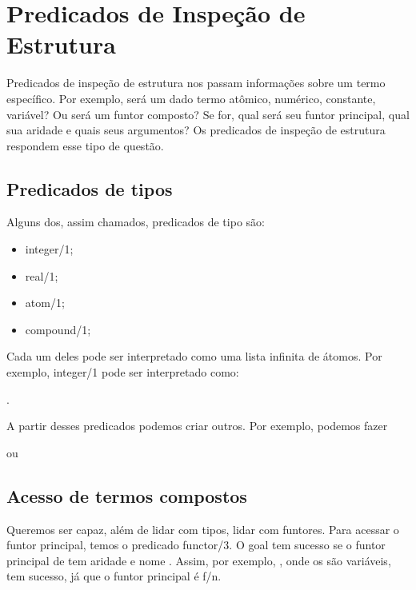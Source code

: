 \documentclass{article}
\begin{document}
\section{Predicados de Inspeção de Estrutura}

Predicados de inspeção de estrutura nos passam informações sobre um termo específico. Por exemplo, será um dado termo atômico, numérico, constante, variável? Ou será um funtor composto? Se for, qual será seu funtor principal, qual sua aridade e quais seus argumentos? Os predicados de inspeção de estrutura respondem esse tipo de questão.

\subsection{Predicados de tipos}

Alguns dos, assim chamados, predicados de tipo são:

\begin{itemize}
  \item integer/1;
  \item real/1;
  \item atom/1;
  \item compound/1;
\end{itemize}

Cada um deles pode ser interpretado como uma lista infinita de átomos. Por exemplo, integer/1 pode ser interpretado como:

.

\noindent A partir desses predicados podemos criar outros. Por exemplo, podemos fazer


\noindent ou


\subsection{Acesso de termos compostos}

Queremos ser capaz, além de lidar com tipos, lidar com funtores. Para acessar o funtor principal, temos o predicado functor/3. O
goal  tem sucesso se o funtor principal de  tem aridade  e nome . Assim, por exemplo, , onde os  são variáveis, tem sucesso, já que o funtor principal é f/n.
\end{document}
